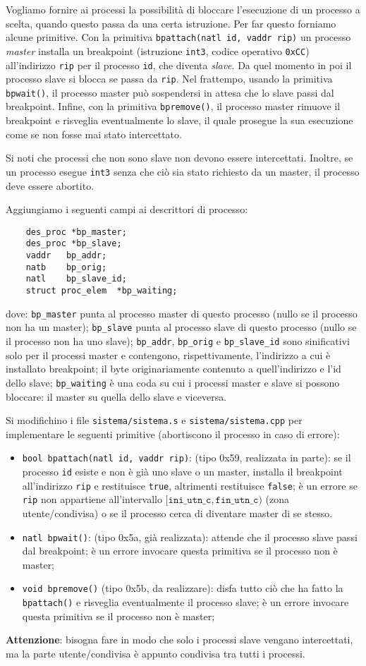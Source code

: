 Vogliamo fornire ai processi la possibilit\`a di bloccare l'esecuzione di un processo a scelta, quando questo passa da una certa istruzione.
Per far questo forniamo alcune primitive. Con la primitiva \verb|bpattach(natl id, vaddr rip)| un processo {\em master} 
installa un breakpoint (istruzione \verb|int3|, codice operativo \verb|0xCC|) 
all'indirizzo \verb|rip| per il processo \verb|id|, che diventa {\em slave}. Da quel momento in poi il processo slave si blocca se passa da \verb|rip|.
Nel frattempo, usando la primitiva \verb|bpwait()|, il processo master
pu\`o sospendersi in attesa che lo slave passi dal breakpoint.
Infine, con la primitiva \verb|bpremove()|, il processo master rimuove il breakpoint e risveglia eventualmente lo slave, il quale
prosegue la sua esecuzione come se non fosse mai stato intercettato.

Si noti che  processi che non sono slave non devono essere intercettati. 
Inoltre, se un processo esegue \verb|int3| senza che ci\`o sia stato richiesto da un master, il processo
deve essere abortito.

Aggiungiamo i seguenti campi ai descrittori di processo:
\begin{verbatim}
    des_proc *bp_master;
    des_proc *bp_slave;
    vaddr	bp_addr;
    natb	bp_orig;
    natl	bp_slave_id;
    struct proc_elem  *bp_waiting;
\end{verbatim}
dove: \verb|bp_master| punta al processo master di questo processo (nullo se il
processo non ha un master); \verb|bp_slave| punta al processo slave di
questo processo (nullo se il processo non ha uno slave);
\verb|bp_addr|, \verb|bp_orig| e \verb|bp_slave_id| sono sinificativi
solo per il processi master e contengono, rispettivamente,
l'indirizzo a cui \`e installato  breakpoint; il byte
originariamente contenuto a quell'indirizzo e l'id dello slave; 
\verb|bp_waiting| \`e una coda su cui i processi master e slave si possono
bloccare: il master su quella dello slave e viceversa.

Si modifichino i file \verb|sistema/sistema.s| e \verb|sistema/sistema.cpp| per implementare le seguenti primitive
(abortiscono il processo in caso di errore):
\begin{itemize}
\item 	\verb|bool bpattach(natl id, vaddr rip)|: (tipo 0x59, realizzata in parte): 
	se il processo \verb|id| esiste e non \`e gi\`a uno slave o un master,
	installa il breakpoint all'indirizzo \verb|rip| e restituisce \verb|true|, altrimenti restituisce \verb|false|;
        \`e un errore se \verb|rip| non appartiene all'intervallo $[\mathtt{ini\_utn\_c}, \mathtt{fin\_utn\_c})$ (zona utente/condivisa)
	o se il processo cerca di diventare master di se stesso.
	\item   \verb|natl bpwait()|: (tipo 0x5a, gi\`a realizzata): attende che il processo slave passi dal breakpoint;
	\`e un errore invocare questa primitiva se il processo non \`e master;
\item   \verb|void bpremove()| (tipo 0x5b, da realizzare): disfa tutto ci\`o che ha fatto la \verb|bpattach()| e risveglia
	eventualmente il processo slave; \`e un errore invocare questa primitiva se il processo non \`e master;
\end{itemize}

{\bf Attenzione}: bisogna fare in modo che solo i processi slave vengano intercettati, ma la parte utente/condivisa \`e appunto condivisa tra tutti i processi.
